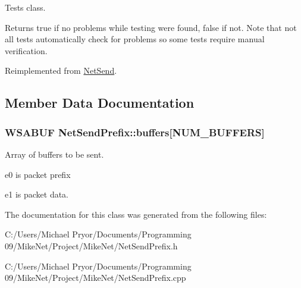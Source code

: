 Tests class. 

\begin{DoxyReturn}{Returns}
true if no problems while testing were found, false if not. Note that not all tests automatically check for problems so some tests require manual verification. 
\end{DoxyReturn}


Reimplemented from \hyperlink{class_net_send_ab93dd370f3117ed82eec3993ba0be71d}{NetSend}.



\subsection{Member Data Documentation}
\hypertarget{class_net_send_prefix_a5826e25aab8cc3719dca77eb991d7861}{
\subsubsection[{buffers}]{\setlength{\rightskip}{0pt plus 5cm}WSABUF {\bf NetSendPrefix::buffers}\mbox{[}{\bf NUM\_\-BUFFERS}\mbox{]}}}
\label{class_net_send_prefix_a5826e25aab8cc3719dca77eb991d7861}


Array of buffers to be sent. 


\begin{DoxyItemize}
\item e0 is packet prefix
\item e1 is packet data. 
\end{DoxyItemize}

The documentation for this class was generated from the following files:\begin{DoxyCompactItemize}
\item 
C:/Users/Michael Pryor/Documents/Programming 09/MikeNet/Project/MikeNet/NetSendPrefix.h\item 
C:/Users/Michael Pryor/Documents/Programming 09/MikeNet/Project/MikeNet/NetSendPrefix.cpp\end{DoxyCompactItemize}
